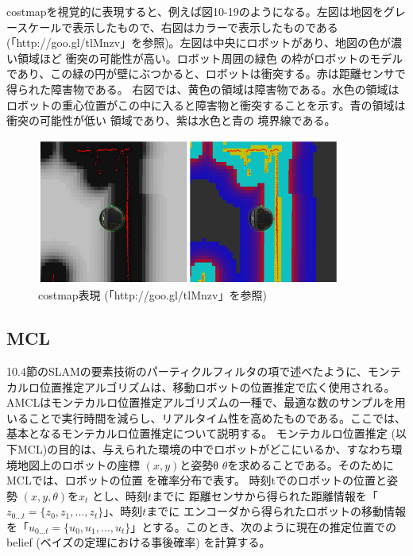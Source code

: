 costmapを視覚的に表現すると、例えば図10-19のようになる。左図は地図をグレースケールで表示したもので、右図はカラーで表示したものである (「http://goo.gl/tlMnzv」を参照)。左図は中央にロボットがあり、地図の色が濃い領域ほど  衝突の可能性が高い。ロボット周囲の緑色  の枠がロボットのモデルであり、この緑の円が壁にぶつかると、ロボットは衝突する。赤は距離センサで得られた障害物である。
右図では、黄色の領域は障害物である。水色の領域はロボットの重心位置がこの中に入ると障害物と衝突することを示す。青の領域は衝突の可能性が低い  領域であり、紫は水色と青の  境界線である。

\begin{figure}[htp]
  \centering
  \includegraphics[width=10cm]{pictures/chapter10/pic_10_19.png}
  \caption{costmap表現 (「http://goo.gl/tlMnzv」を参照)}
\end{figure}

\subsection{MCL}

10.4節のSLAMの要素技術のパーティクルフィルタの項で述べたように、モンテカルロ位置推定アルゴリズムは、移動ロボットの位置推定で広く使用される。AMCLはモンテカルロ位置推定アルゴリズムの一種で、最適な数のサンプルを用いることで実行時間を減らし、リアルタイム性を高めたものである。ここでは、基本となるモンテカルロ位置推定について説明する。
モンテカルロ位置推定 (以下MCL)の目的は、与えられた環境の中でロボットがどこにいるか、すなわち環境地図上のロボットの座標 $(x, y)$と姿勢θ $\theta$を求めることである。そのためにMCLでは、ロボットの位置 を確率分布で表す。
 時刻tでのロボットの位置と姿勢 $(x, y, \theta)$を$x_t$ とし、時刻$t$までに  距離センサから得られた距離情報を「 $z_{0...t} = \{z_0, z_1, ..., z_t\}$」、時刻$t$までに  エンコーダから得られたロボットの移動情報を「$u_{0...t} = \{u_0, u_1, ..., u_t\}$」とする。このとき、次のように現在の推定位置でのbelief (ベイズの定理における事後確率)  を計算する。


